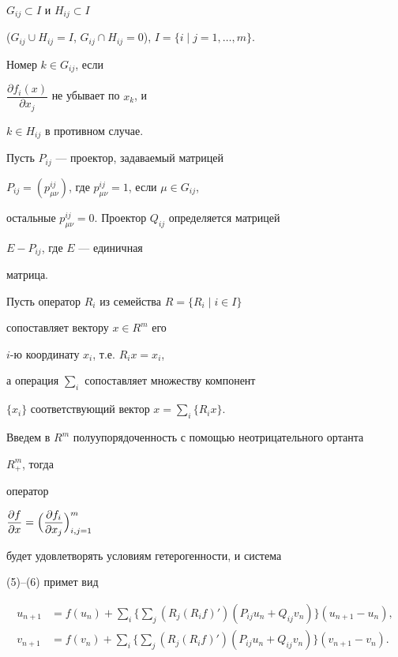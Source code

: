 $G_{ij}\subset I$ и $H_{ij}\subset I$


($G_{ij}\cup H_{ij}=I$, $G_{ij}\cap H_{ij}=0$), $I=\{i\mid


j=1,\dotsc,m\}$.


Номер $k\in G_{ij}$, если


$\dfrac{\partial f_i(x)}{\partial x_j}$ не убывает по $x_k$, и


$k\in H_{ij}$ в противном случае.





Пусть $P_{ij}$ --- проектор, задаваемый матрицей


$P_{ij}=(p^{ij}_{\mu\nu})$, где $p^{ij}_{\mu\nu}=1$, если $\mu\in G_{ij}$,


остальные $p^{ij}_{\mu\nu}=0$. Проектор $Q_{ij}$ определяется матрицей


$E-P_{ij}$, где $E$ --- единичная


матрица.





Пусть оператор $R_i$ из семейства $R=\{R_i\mid i\in I\}$


сопоставляет вектору $x\in R^m$ его


$i$-ю координату $x_i$, т.е. $R_ix=x_i$,


а операция $\sum\limits_i$ сопоставляет множеству компонент


$\{x_i\}$ соответствующий вектор $x=\sum\limits_i\{R_ix\}$.





Введем в $R^m$ полуупорядоченность с помощью неотрицательного ортанта


$R^m_+$, тогда


оператор


$\dfrac{\partial f}{\partial x}=\Bigl(


\dfrac{\partial f_i}{\partial x_j}\Bigr)^m_{i,j=1}$


будет удовлетворять условиям гетерогенности, и система


(5)--(6) примет вид


\begin{equation}


\begin{split}


u_{n+1}&=f(u_n)+\sum_i\biggl\{


\sum_j(R_j(R_if)')(P_{ij}u_n+Q_{ij}v_n)\biggr\}(u_{n+1}-u_n),\\


v_{n+1}&=f(v_n)+\sum_i\biggl\{\sum_j


(R_j(R_if)')(P_{ij}u_n+Q_{ij}v_n)\biggr\}(v_{n+1}-v_n).


\end{split}


\end{equation}


